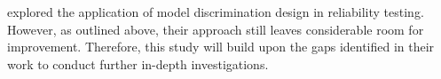 \hspace*{8mm} \cite{nasir2015simulation} explored the application of model discrimination design in reliability testing. However, as outlined above, their approach still leaves considerable room for improvement. Therefore, this study will build upon the gaps identified in their work to conduct further in-depth investigations.